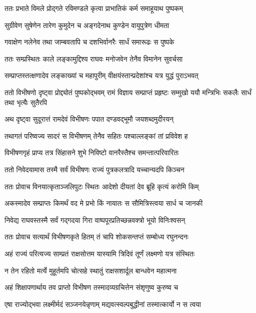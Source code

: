 \twolineshloka
{ततः प्रभाते विमले प्रोद्गते रविमण्डले}
{कृत्वा प्राभातिकं कर्म समाहूयाथ पुष्पकम्}%

\twolineshloka
{सुग्रीवेण सुषेणेन तारेण कुमुदेन च}
{अङ्गदेनाथ कुण्डेन वायुपुत्रेण धीमता}%

\twolineshloka
{गवाक्षेण नलेनेव तथा जाम्बवतापि च}
{दशभिर्वानरैः सार्धं समारूढः स पुष्पके}%

\twolineshloka
{ततः सम्प्रस्थितः काले लङ्कामुद्दिश्य राघवः}
{मनोजवेन तेनैव विमानेन सुवर्चसा}%

\twolineshloka
{सम्प्राप्तस्तत्क्षणादेव लङ्काख्यां च महापुरीम्}
{वीक्षयंस्तान्प्रदेशांश्च यत्र युद्धं पुराऽभवत्}%

\threelineshloka
{ततो विभीषणो दृष्ट्वा प्रोद्द्योतं पुष्पकोद्भवम्}
{रामं विज्ञाय सम्प्राप्तं प्रहृष्टः सम्मुखो ययौ}
{मन्त्रिभिः सकलैः सार्धं तथा भृत्यैः सुतैरपि}%

\twolineshloka
{अथ दृष्ट्वा सुदूरात्तं रामदेवं विभीषणः}
{पपात दण्डवद्भूमौ जयशब्दमुदीरयन्}%

\twolineshloka
{तथागतं परिष्वज्य सादरं स विभीषणम्}
{तेनैव सहितः पश्चाल्लङ्कां तां प्रविवेश ह}%

\twolineshloka
{विभीषणगृहं प्राप्य तत्र सिंहासने शुभे}
{निविष्टो वानरैस्तैश्च समन्तात्परिवारितः}%

\twolineshloka
{ततो निवेदयामास तस्मै सर्वं विभीषणः}
{राज्यं पुत्रकलत्रादि यच्चान्यदपि किञ्चन}%

\twolineshloka
{ततः प्रोवाच विनयात्कृताञ्जलिपुटः स्थितः}
{आदेशो दीयतां देव ब्रूहि कृत्यं करोमि किम्}%

\twolineshloka
{अकस्मादेव सम्प्राप्तः किमर्थं वद मे प्रभो}
{किं नायातः स सौमित्रिस्त्वया सार्ध च जानकी}%


\twolineshloka
{निवेद्य राघवस्तस्मै सर्वं गद्गदया गिरा}
{वाष्पपूरप्रतिच्छन्नवक्त्रो भूयो विनिःश्वसन्}%

\twolineshloka
{ततः प्रोवाच सत्यार्थं विभीषणकृते हितम्}
{तं चापि शोकसन्तप्तं सम्बोध्य रघुनन्दनः}%

\twolineshloka
{अहं राज्यं परित्यज्य साम्प्रतं राक्षसोत्तम}
{यास्यामि त्रिदिवं तूर्णं लक्ष्मणो यत्र संस्थितः}%

\twolineshloka
{न तेन रहितो मर्त्ये मुहूर्तमपि चोत्सहे}
{स्थातुं राक्षसशार्दूल बान्धवेन महात्मना}%

\twolineshloka
{अहं शिक्षापणार्थाय तव प्राप्तो विभीषण}
{तस्मादव्यग्रचित्तेन संशृणुष्व कुरुष्व च}%

\twolineshloka
{एषा राज्योद्भवा लक्ष्मीर्मदं सञ्जनयेन्नृणाम्}
{मद्यवत्स्वल्पबुद्धीनां तस्मात्कार्यो न स त्वया}%

